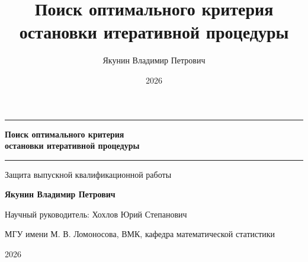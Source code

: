 \documentclass[aspectratio=169,11pt]{beamer}
\title{Поиск оптимального критерия остановки итеративной процедуры}
\author{Якунин Владимир Петрович}
\date{2026}
\begin{document}
\begin{frame}[plain]
\centering
\vspace{1mm}
{\color{msuBlue}\rule{0.80\paperwidth}{0.7pt}}\par
\vspace{5mm}
{\color{msuBlue}\bfseries\fontsize{21}{25}\selectfont Поиск оптимального критерия\\[1mm] остановки итеративной процедуры}\par
\vspace{4mm}
{\color{msuBlue}\rule{16mm}{1.0pt}}\par
\vspace{4mm}
{\large Защита выпускной квалификационной работы}\par
\vspace{6mm}
{\normalsize\bfseries Якунин Владимир Петрович}\par
\vspace{1.5mm}
{\normalsize Научный руководитель: Хохлов Юрий Степанович}\par
\vspace{5mm}
{\small МГУ имени М. В. Ломоносова, ВМК, кафедра математической статистики}\par
\vfill
{\normalsize 2026}\par
\vspace{1mm}
\end{frame}
\end{document}
